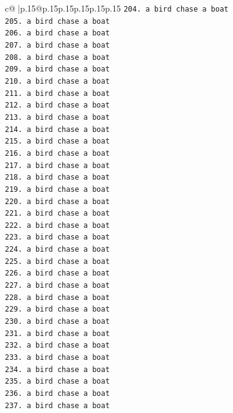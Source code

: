 \documentclass{article}
\begin{document}
{\begin{supertabular}{c@{$\;$}|p{.15\linewidth}@{}p{.15\linewidth}p{.15\linewidth}p{.15\linewidth}p{.15\linewidth}p{.15\linewidth}}
{{{\texttt{204. a bird chase a boat} \\
\texttt{205. a bird chase a boat} \\
\texttt{206. a bird chase a boat} \\
\texttt{207. a bird chase a boat} \\
\texttt{208. a bird chase a boat} \\
\texttt{209. a bird chase a boat} \\
\texttt{210. a bird chase a boat} \\
\texttt{211. a bird chase a boat} \\
\texttt{212. a bird chase a boat} \\
\texttt{213. a bird chase a boat} \\
\texttt{214. a bird chase a boat} \\
\texttt{215. a bird chase a boat} \\
\texttt{216. a bird chase a boat} \\
\texttt{217. a bird chase a boat} \\
\texttt{218. a bird chase a boat} \\
\texttt{219. a bird chase a boat} \\
\texttt{220. a bird chase a boat} \\
\texttt{221. a bird chase a boat} \\
\texttt{222. a bird chase a boat} \\
\texttt{223. a bird chase a boat} \\
\texttt{224. a bird chase a boat} \\
\texttt{225. a bird chase a boat} \\
\texttt{226. a bird chase a boat} \\
\texttt{227. a bird chase a boat} \\
\texttt{228. a bird chase a boat} \\
\texttt{229. a bird chase a boat} \\
\texttt{230. a bird chase a boat} \\
\texttt{231. a bird chase a boat} \\
\texttt{232. a bird chase a boat} \\
\texttt{233. a bird chase a boat} \\
\texttt{234. a bird chase a boat} \\
\texttt{235. a bird chase a boat} \\
\texttt{236. a bird chase a boat} \\
\texttt{237. a bird chase a boat} \\
}}}
\end{supertabular}}
\end{document}
